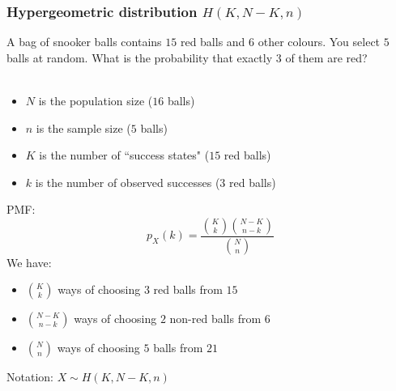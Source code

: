 \documentclass[t,8pt]{beamer}%
\begin{document}
    \begin{frame}
    
	\frametitle{Hypergeometric distribution $H(K,N-K,n)$}
        {\color{gray}
        A bag of snooker balls contains $15$ red balls and $6$ other colours. You select $5$ balls at random. What is the probability that exactly $3$ of them are red? \\~\\
        }
        \begin{itemize}
            \item $N$ is the population size ($16$ balls)
            \item $n$ is the sample size ($5$ balls)
            \item $K$ is the number of ``success states" ($15$ red balls)
            \item $k$ is the number of observed successes ($3$ red balls)
        \end{itemize}
        PMF:
        $$p_X(k)=\frac{{K\choose k}{N-K\choose n-k}}{{N\choose n}}$$
        We have:
        \begin{itemize}
            \item ${K\choose k}$ ways of choosing $3$ red balls from $15$
            \item ${N-K\choose n-k}$ ways of choosing $2$ non-red balls from $6$
            \item ${N\choose n}$ ways of choosing $5$ balls from $21$
        \end{itemize}
        Notation: $X\sim H(K,N-K,n)$
    \end{frame}
\end{document}
